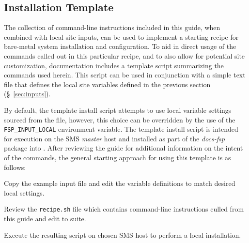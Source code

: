 \subsection{Installation Template}
The collection of command-line instructions included in this guide, when
combined with local site inputs, can be used to implement a starting recipe for
bare-metal system installation and configuration. To aid in direct usage of the
commands called out in this particular recipe, and to also allow for potential
site customization, \FSP{} documentation includes a template script summarizing
the commands used herein. This script can be used in conjunction with a simple
text file that defines the local site variables defined in the previous section
(\S~\ref{sec:inputs}).

By default, the template install script attempts to use local variable settings
sourced from the  file,
however, this choice can be overridden by the use of the
\texttt{FSP\_INPUT\_LOCAL} environment variable. The template install script is
intended for execution on the SMS {\em master} host and installed as part of
the {\em docs-fsp} package into .
After reviewing the guide for additional information on the intent of the
commands, the general starting approach for using this template is as follows:


\begin{itemize*}
\item Copy the  example
  input file and edit the variable definitions to match desired local settings.
\item Review the \texttt{recipe.sh} file which contains
  command-line instructions culled from this guide and edit to suite.
\item Execute the resulting script on chosen SMS host to perform a local installation.
\end{itemize*}



